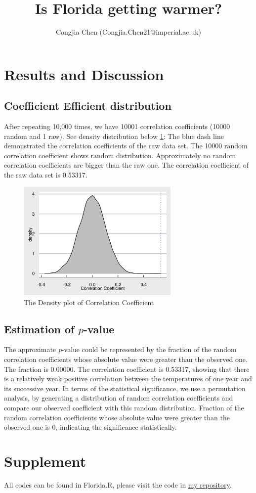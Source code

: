\documentclass{article}
\title{Is Florida getting warmer?}
\author{Congjia Chen (Congjia.Chen21@imperial.ac.uk)}
\begin{document}
\maketitle

\section{Results and Discussion}

\subsection{Coefficient Efficient distribution}
After repeating 10,000 times, we have 10001 correlation coefficients (10000 random and 1 raw). See density distribution below \ref{fig:Density_plot}:
The blue dash line demonstrated the correlation coefficients of the raw data set. The 10000 random correlation coefficient shows random distribution. Approximately no random correlation coefficients are bigger than the raw one. The correlation coefficient of the raw data set is 0.53317.
\begin{figure}[H]
\centering
\includegraphics[width=0.7\textwidth]{Density_plot.png}
\caption{\label{fig:Density_plot}The Density plot of Correlation Coefficient}
\end{figure}

\subsection{Estimation of \texorpdfstring{$\mathit{p}$}{}-value}
The approximate \textit{p}-value could be represented by the fraction of the random correlation coefficients whose absolute value were greater than the observed one. The fraction is 0.00000.
The correlation coefficient is 0.53317, showing that there is a relatively weak positive correlation between the temperatures of one year and its successive year. In terms of the statistical significance, we use a permutation analysis, by generating a distribution of random correlation coefficients and compare our observed coefficient with this random distribution. Fraction of the random correlation coefficients whose absolute value were greater than the observed one is 0, indicating the significance statistically.

\section{Supplement}
  All codes can be found in Florida.R, please visit the code in \href{https://github.com/nedchen2/CMEECourseWork/blob/master/week3/code/Florida.R}{my repository}.
\end{document}
